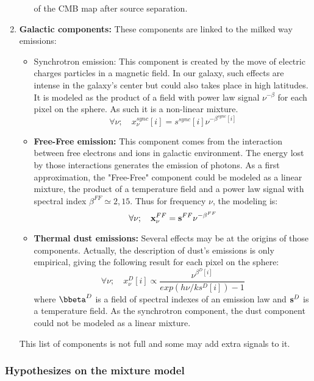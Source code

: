 \begin{enumerate}
\begin{itemize}
of the CMB map after source separation.
\end{itemize}
\item {\bf Galactic components:} These components are linked to the milked way emissions:
\begin{itemize}
\item {Synchrotron emission:} This component is created by the move of electric charges particles in a magnetic field. In our galaxy, such effects are intense in 
the galaxy's center but could also takes place in high latitudes. It is modeled as the product of a field with power law signal $\nu^{-\beta}$ for each pixel 
on the sphere. As such it is a non-linear mixture.
\begin{equation}
\forall \nu; \quad { x}_\nu^{sync}[i] = { s}^{sync}[i]\nu^{-\beta^{sync}[i]}
\end{equation}
\item {\bf Free-Free emission:} This component comes from the interaction between free electrons and ions in galactic environment. The energy lost by those interactions 
generates the emission of photons. As a first approximation, the "Free-Free" component could be modeled as a linear mixture, the product of a temperature field and a power 
law signal with spectral index $\beta^{FF} \simeq 2,15$. Thus for frequency $\nu$, the modeling is:
\begin{equation}
\forall \nu; \quad {\bf x}_\nu^{FF} = {\bf s}^{FF}\nu^{-\beta^{FF}}
\end{equation}
\item {\bf Thermal dust emissions:} Several effects may be at the origins of those components. Actually, the description of dust's emissions is only empirical, giving 
the following result for each pixel on the sphere:
\begin{equation}
\forall \nu; \quad {x}_\nu^{D}[i] \propto \frac{\nu^{\beta^D[i]}}{exp(h\nu/k {s}^D[i]) - 1}
\end{equation}
where $\bbeta^D$ is a field of spectral indexes of an emission law and ${\bf s}^D$ is a temperature field. As the synchrotron component, the dust component could not be modeled as a linear mixture.
\end{itemize}
This list of components is not full and some may add extra signals to it.
\end{enumerate}

\subsubsection{Hypothesizes on the mixture model}

